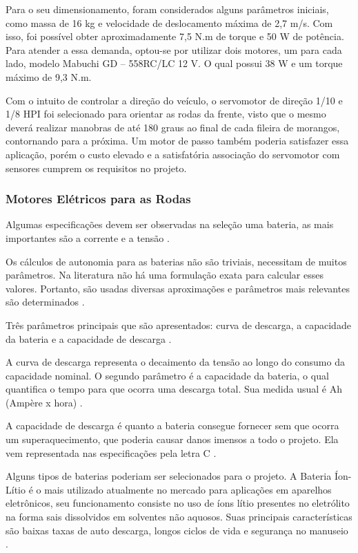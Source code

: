     Para o seu dimensionamento, foram considerados alguns parâmetros iniciais, como massa de 16 kg e velocidade de 
    deslocamento máxima de 2,7 m/s. Com isso, foi possível obter aproximadamente 7,5 N.m de torque e 50 W de potência. 
    Para atender a essa demanda, optou-se por utilizar dois motores, um para cada lado, modelo Mabuchi GD – 558RC/LC 12 V. 
    O qual possui 38 W e um torque máximo de 9,3 N.m.
    
    Com o intuito de controlar a direção do veículo, o servomotor de direção 1/10 e 1/8 HPI foi selecionado para 
    orientar as rodas da frente, visto que o mesmo deverá realizar manobras de até 180 graus ao final de cada fileira 
    de morangos, contornando para a próxima. Um motor de passo também poderia satisfazer essa aplicação, porém o custo 
    elevado e a satisfatória associação do servomotor com sensores cumprem os requisitos no projeto.
    
     \subsubsection{Motores Elétricos para as Rodas}
     
     Algumas especificações devem ser observadas na seleção uma bateria, as mais importantes são a corrente e a 
     tensão \cite{MAGALHAES}.
     
     Os cálculos de autonomia para as baterias não são triviais, necessitam de muitos parâmetros. Na literatura não 
     há uma formulação exata para calcular esses valores. Portanto, são usadas diversas aproximações e parâmetros mais 
     relevantes são determinados \cite{MEGGLIAR}.

     Três parâmetros principais que são apresentados: curva de descarga, a capacidade da bateria e a capacidade de 
     descarga \cite{MEGGLIAR}.
     
     A curva de descarga representa o decaimento da tensão ao longo do consumo da capacidade nominal. O segundo parâmetro 
     é a capacidade da bateria, o qual quantifica o tempo para que ocorra uma descarga total. Sua medida usual é Ah 
     (Ampère x hora) \cite{MEGGLIAR}.
     
     A capacidade de descarga é quanto a bateria consegue fornecer sem que ocorra um superaquecimento, que poderia 
     causar danos imensos a todo o projeto. Ela vem representada nas especificações pela letra C \cite{MEGGLIAR}.
     
     Alguns tipos de baterias poderiam ser selecionados para o projeto. A Bateria Íon- Lítio é o mais utilizado atualmente 
     no mercado para aplicações em aparelhos eletrônicos, seu funcionamento consiste no uso de íons lítio presentes no 
     eletrólito na forma sais dissolvidos em solventes não aquosos. Suas principais características são baixas taxas de auto 
     descarga, longos ciclos de vida e segurança no manuseio \cite{castillo2002advances}.
     
